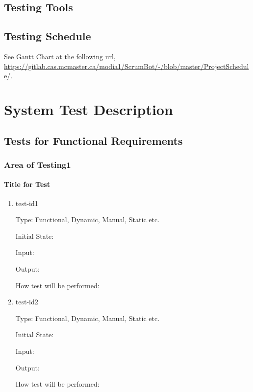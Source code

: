 \documentclass[12pt, titlepage]{article}
\begin{document}
\subsection{Testing Tools}


\subsection{Testing Schedule}
See Gantt Chart at the following url, \url{https://gitlab.cas.mcmaster.ca/modia1/ScrumBot/-/blob/master/ProjectSchedule/}.

\section{System Test Description}
	
\subsection{Tests for Functional Requirements}

\subsubsection{Area of Testing1}
		
\paragraph{Title for Test}

\begin{enumerate}

\item{test-id1\\}

Type: Functional, Dynamic, Manual, Static etc.
					
Initial State: 
					
Input: 
					
Output: 
					
How test will be performed: 
					
\item{test-id2\\}

Type: Functional, Dynamic, Manual, Static etc.
					
Initial State: 
					
Input: 
					
Output: 
					
How test will be performed: 

\end{enumerate}
\end{document}
